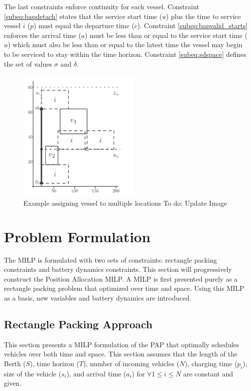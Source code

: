\documentclass[letterpaper, 10pt, conference]{IEEEtran}
\newcommand{\TODO}[1]{{\color{green} To do: #1}} %
\begin{document}
The last constraints enforce continuity for each vessel. Constraint \ref{subeq:bapdetach} states that the service start time (\(u\)) plus the time to service vessel \(i\) (\(p\)) must equal the departure time (\(c\)). Constraint \ref{subeq:bapvalid_starts} enforces the arrival time (\(a\)) must be less than or equal to the service start time (\(u\)) which must also be less than or equal to the latest time the vessel may begin to be serviced to stay within the time horizon. Constraint \ref{subeq:sdspace} defines the set of values \(\sigma\) and \(\delta\).

\begin{figure}
	\centerline{\includegraphics[width=6cm]{multipleassign.png}}
	\caption{Example assigning vessel to multiple locations\TODO{Update Image}}
	\label{fig:multipleassign}
\end{figure}

%
\section{Problem Formulation}
\label{sec:problemformulation}
The MILP is formulated with two sets of constraints: rectangle packing constraints and battery dynamics constraints. This section will progressively construct the Position Allocation MILP. A MILP is first presented purely as a rectangle packing problem that optimized over time and space. Using this MILP as a basis, new variables and battery dynamics are introduced.

\subsection{Rectangle Packing Approach}
This section presents a MILP formulation of the PAP that optimally schedules vehicles over both time and space. This section assumes that the length of the Berth ($S$), time horizon ($T$), number of incoming vehicles ($N$), charging time ($p_i$), size of the vehicle ($s_i$), and arrival time ($a_i$) for $\forall 1 \leq i \leq N$ are constant and given.
\end{document}
